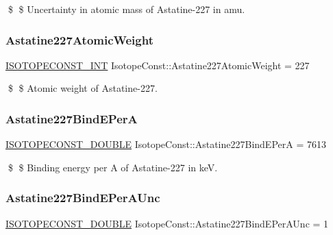 \$ \$ Uncertainty in atomic mass of Astatine-\/227 in amu. \mbox{\label{group___isotope_const-_astatine-_at227_gaa19bd0a97be4f03ae55d080fd14870a1}} 
\subsubsection{\texorpdfstring{Astatine227\+Atomic\+Weight}{Astatine227AtomicWeight}}
{\footnotesize\ttfamily \mbox{\hyperlink{group___isotope_const-_macros_ga5f18360b3e99483a35c32d789e62621c}{I\+S\+O\+T\+O\+P\+E\+C\+O\+N\+S\+T\+\_\+\+I\+NT}} Isotope\+Const\+::\+Astatine227\+Atomic\+Weight = 227}

\$ \$ Atomic weight of Astatine-\/227. \mbox{\label{group___isotope_const-_astatine-_at227_ga9d0220cfdbb82218a3a2894b86a56dac}} 
\subsubsection{\texorpdfstring{Astatine227\+Bind\+E\+PerA}{Astatine227BindEPerA}}
{\footnotesize\ttfamily \mbox{\hyperlink{group___isotope_const-_macros_ga8f45a7272ce02c0b4c65c44636ed719a}{I\+S\+O\+T\+O\+P\+E\+C\+O\+N\+S\+T\+\_\+\+D\+O\+U\+B\+LE}} Isotope\+Const\+::\+Astatine227\+Bind\+E\+PerA = 7613}

\$ \$ Binding energy per A of Astatine-\/227 in keV. \mbox{\label{group___isotope_const-_astatine-_at227_ga3767730007e149d69b7cfdf9e7012112}} 
\subsubsection{\texorpdfstring{Astatine227\+Bind\+E\+Per\+A\+Unc}{Astatine227BindEPerAUnc}}
{\footnotesize\ttfamily \mbox{\hyperlink{group___isotope_const-_macros_ga8f45a7272ce02c0b4c65c44636ed719a}{I\+S\+O\+T\+O\+P\+E\+C\+O\+N\+S\+T\+\_\+\+D\+O\+U\+B\+LE}} Isotope\+Const\+::\+Astatine227\+Bind\+E\+Per\+A\+Unc = 1}

